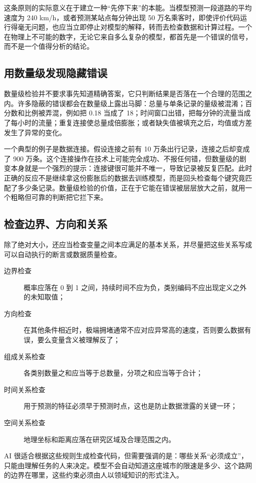 这条原则的实际意义在于建立一种“先停下来”的本能。当模型预测一段道路的平均速度为 240 km/h，或者预测某站点每分钟出现 50 万名乘客时，即使评价代码运行得毫无问题，也应当立即停止对模型的解释，转而去检查数据和计算过程。一个在物理上不可能的数字，无论它来自多么复杂的模型，都首先是一个错误的信号，而不是一个值得分析的结论。

\subsection{用数量级发现隐藏错误}

数量级检验并不要求事先知道精确答案，它只判断结果是否落在一个合理的范围之内。许多隐蔽的错误都会在数量级上露出马脚：总量与单条记录的量级被混淆；百分数和比例被弄混，例如把 0.18 当成了 18；时间窗口出错，把每分钟的流量当成了每小时的流量；重复连接使总量成倍膨胀；或者缺失值被填充之后，均值或方差发生了异常的变化。

一个典型的例子是数据连接。假设连接之前有 10 万条出行记录，连接之后却变成了 900 万条。这个连接操作在技术上可能完全成功、不报任何错，但数量级的剧变本身就是一个强烈的提示：连接键很可能并不唯一，导致记录被反复匹配。此时正确的反应不是继续拿这份膨胀后的数据去训练模型，而是回头检查每个键究竟匹配了多少条记录。数量级检验的价值，正在于它能在错误被层层放大之前，就用一个粗略但可靠的判断把它拦下来。

\subsection{检查边界、方向和关系}

除了绝对大小，还应当检查变量之间本应满足的基本关系，并尽量把这些关系写成可以自动执行的断言或数据质量检查。

\begin{description}
  \item[边界检查] 概率应落在 0 到 1 之间，持续时间不应为负，类别编码不应出现定义之外的未知取值；
  \item[方向检查] 在其他条件相近时，极端拥堵通常不应对应异常高的速度，否则要么数据有误，要么变量含义被理解反了；
  \item[组成关系检查] 各类别数量之和应当等于总数量，分项之和应当等于合计；
  \item[时间关系检查] 用于预测的特征必须早于预测时点，这也是防止数据泄露的关键一环；
  \item[空间关系检查] 地理坐标和距离应落在研究区域及合理范围之内。
\end{description}

AI 很适合根据这些规则生成检查代码，但需要强调的是：哪些关系“必须成立”，只能由理解任务的人来决定。模型不会自动知道这座城市的限速是多少、这个路网的边界在哪里，这些约束必须由人以领域知识的形式注入。

